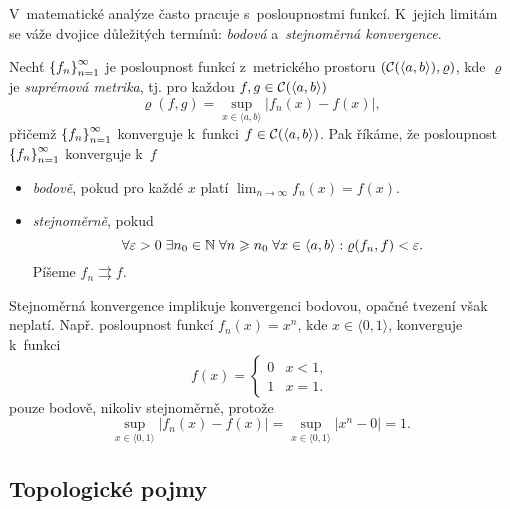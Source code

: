 V~matematické analýze často pracuje s~posloupnostmi funkcí. K~jejich limitám se váže dvojice důležitých termínů: \emph{bodová} a~\emph{stejnoměrná konvergence}.
\begin{definition}\label{def:bodova-stejnomerna-konvergence}
    Nechť $\left\{f_n\right\}_{n=1}^\infty$ je posloupnost funkcí z~metrického prostoru $(\mathcal{C}(\langle a,b\rangle),\varrho)$, kde $\varrho$ je \emph{suprémová metrika}, tj. pro každou $f,g\in \mathcal{C}(\langle a,b\rangle)$
    \[\varrho(f,g)=\sup_{x\in\langle a,b\rangle}|f_n(x)-f(x)|,\]
    přičemž $\left\{f_n\right\}_{n=1}^\infty$ konverguje k~funkci $f\in \mathcal{C}(\langle a,b\rangle)$.
    Pak říkáme, že posloupnost $\left\{f_n\right\}_{n=1}^\infty$ konverguje k~$f$
    \begin{itemize}
        \item \emph{bodově}, pokud pro každé $x$ platí $\lim_{n\to\infty}f_n(x)=f(x)$.
        \item \emph{stejnoměrně}, pokud
        \[\forall\varepsilon>0\;\exists n_0\in\mathbb{N}\;\forall n\geqslant n_0\;\forall x\in\langle a,b\rangle: \varrho(f_n,f)<\varepsilon.\]
        Píšeme $f_n\rightrightarrows f$.
    \end{itemize}
\end{definition}
Stejnoměrná konvergence implikuje konvergenci bodovou, opačné tvezení však neplatí. Např. posloupnost funkcí $f_n(x)=x^n$, kde $x\in\langle 0,1\rangle$, konverguje k~funkci 
\[f(x)=\begin{cases}
    0 & x < 1,\\
    1 & x = 1.
\end{cases}\]
pouze bodově, nikoliv stejnoměrně, protože
\[\sup_{x\in\langle 0,1\rangle}|f_n(x)-f(x)|=\sup_{x\in\langle 0,1\rangle}|x^n-0|=1.\]

\subsection{Topologické pojmy}\label{subsec:topologicke-pojmy}

